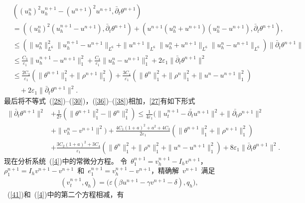 \documentclass[twoside,UTF8]{nputhesis}
\begin{document}
\begin{equation}
\begin{split}
&\left((u^n_h)^2u^{n+1}_h-(u^{n+1})^2u^{n+1},\bar{\partial}_t\theta^{n+1} \right)\\
&=((u^n_h)^2(u^{n+1}_h-u^{n+1}),\bar{\partial}_t\theta^{n+1})+(u^{n+1}(u^n_h+u^{n+1})(u^n_h-u^{n+1}),\bar{\partial}_t\theta^{n+1}),\\
&\leq\!(\parallel u^n_h\parallel_{L^6}^2\parallel u^{n+1}_h\!-\!u^{n+1}\parallel_{L^6}\!+\| u^{n+1}\|_{L^6}\| u^{n}_h\!+\!u^{n+1}\|_{L^6}\| u^n_h-u^{n+1}\|_{L^6})\| \bar{\partial}_t\theta^{n+1} \|\\
&\leq \frac{C_3}{\varepsilon_1}\| u^{n+1}_h-u^{n+1}\|^2_1+\frac{C_4}{\varepsilon_1}\parallel u^n_h-u^{n+1}\parallel^2_1+2\varepsilon_1\|\bar{\partial}_t\theta^{n+1} \|^2\\
&\leq\frac{2C_3}{\varepsilon_1}(\|\theta^{n+1}\|^2_1+\|\rho^{n+1}\|^2_1)+\frac{3C_4}{\varepsilon_1}(\| \theta^n\|^2_1+\| \rho^n\|^2_1+\| u^n-u^{n+1}\|^2_1)\\
&\quad+2\varepsilon_1\|\bar{\partial}_t\theta^{n+1} \|^2.
\label{38}
\end{split}
\end{equation}
最后将不等式~(\ref{28})--(\ref{30})，(\ref{36})--(\ref{38})相加，\eqref{27}有如下形式
\begin{equation}
\begin{split}
\| \bar{\partial}_t\theta^{n+1} \|^2&+\frac{1}{2\tau}(\| \theta^{n+1}\|^2_1-\| \theta^n\|^2_1)
\leq \frac{1}{4\varepsilon_1}(\| u^{n+1}_t-\bar{\partial_t}u^{n+1}\|^2+\| \bar{\partial_t}\rho^{n+1}\|^2\\
&+\| v^n_h-v^{n+1}\|^2)+\frac{4C_1(1+a)^2+a^2+4C_3}{2\varepsilon_1}(\| \theta^{n+1}\|^2_1+\| \rho^{n+1}\|^2_1)\\
&+\frac{3C_2(1+a)^2+3C_4}{\varepsilon_1}(\| \theta^n\|^2_1+\| \rho^n\|^2_1+\| u^n-u^{n+1}\|^2_1)+8\varepsilon_1\| \bar{\partial}_t\theta^{n+1} \|^2.
\label{40}
\end{split}
\end{equation}
现在分析系统~(\ref{4})中的常微分方程。
令~$\theta_1^{n+1}=v_h^{n+1}-I_hv^{n+1}$，$\rho^{n+1}_1=I_hv^{n+1}-v^{n+1}$~和~$e^{n+1}_1=v^{n+1}_h-v^{n+1}$，精确解~$v^{n+1}$~满足
\begin{equation}
\begin{split}
(v_t^{n+1},q_h)=\big(\varepsilon(\beta u^{n+1}-\gamma v^{n+1}-\delta),q_h\big),
\label{41}
\end{split}
\end{equation}
~(\ref{41})和~(\ref{4})中的第二个方程相减，有
\end{document}
